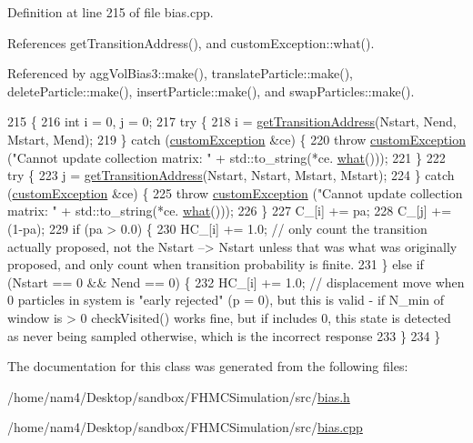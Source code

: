 Definition at line 215 of file bias.\-cpp.



References get\-Transition\-Address(), and custom\-Exception\-::what().



Referenced by agg\-Vol\-Bias3\-::make(), translate\-Particle\-::make(), delete\-Particle\-::make(), insert\-Particle\-::make(), and swap\-Particles\-::make().


\begin{DoxyCode}
215                                                                                                        \{
216     \textcolor{keywordtype}{int} i = 0, j = 0;
217     \textcolor{keywordflow}{try} \{
218         i = \hyperlink{classtmmc_ae296df3336ebf0fa1db7c34972c544eb}{getTransitionAddress}(Nstart, Nend, Mstart, Mend);
219     \} \textcolor{keywordflow}{catch} (\hyperlink{classcustom_exception}{customException} &ce) \{
220         \textcolor{keywordflow}{throw} \hyperlink{classcustom_exception}{customException} (\textcolor{stringliteral}{"Cannot update collection matrix: "} + std::to\_string(*ce.
      \hyperlink{classcustom_exception_aeb6ab5848b038adfc68fde86a512f691}{what}()));
221     \}
222     \textcolor{keywordflow}{try} \{
223         j = \hyperlink{classtmmc_ae296df3336ebf0fa1db7c34972c544eb}{getTransitionAddress}(Nstart, Nstart, Mstart, Mstart);
224     \} \textcolor{keywordflow}{catch} (\hyperlink{classcustom_exception}{customException} &ce) \{
225         \textcolor{keywordflow}{throw} \hyperlink{classcustom_exception}{customException} (\textcolor{stringliteral}{"Cannot update collection matrix: "} + std::to\_string(*ce.
      \hyperlink{classcustom_exception_aeb6ab5848b038adfc68fde86a512f691}{what}()));
226     \}
227     C\_[i] += pa;
228     C\_[j] += (1-pa);
229     \textcolor{keywordflow}{if} (pa > 0.0) \{
230         HC\_[i] += 1.0; \textcolor{comment}{// only count the transition actually proposed, not the Nstart --> Nstart unless
       that was what was originally proposed, and only count when transition probability is finite.}
231     \} \textcolor{keywordflow}{else} \textcolor{keywordflow}{if} (Nstart == 0 && Nend == 0) \{
232     HC\_[i] += 1.0; \textcolor{comment}{// displacement move when 0 particles in system is "early rejected" (p = 0), but this is
       valid - if N\_min of window is > 0 checkVisited() works fine, but if includes 0, this state is detected as
       never being sampled otherwise, which is the incorrect response}
233     \}
234 \}
\end{DoxyCode}


The documentation for this class was generated from the following files\-:\begin{DoxyCompactItemize}
\item 
/home/nam4/\-Desktop/sandbox/\-F\-H\-M\-C\-Simulation/src/\hyperlink{bias_8h}{bias.\-h}\item 
/home/nam4/\-Desktop/sandbox/\-F\-H\-M\-C\-Simulation/src/\hyperlink{bias_8cpp}{bias.\-cpp}\end{DoxyCompactItemize}
